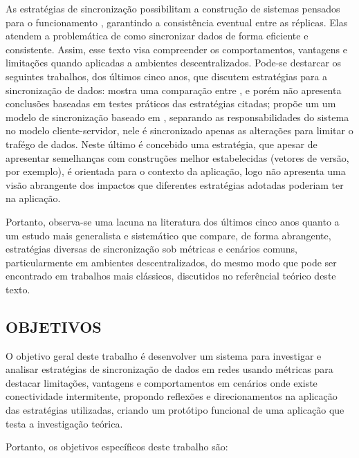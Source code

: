 As estratégias de sincronização possibilitam a construção de sistemas pensados para o funcionamento , garantindo a consistência eventual entre as réplicas. Elas atendem a problemática de como sincronizar dados de forma eficiente e consistente. Assim, esse texto visa compreender os comportamentos, vantagens e limitações quando aplicadas a ambientes descentralizados. Pode-se destarcar os seguintes trabalhos, dos últimos cinco anos, que discutem estratégias para a sincronização de dados:  \cite{pothineni2024offlinefirst} mostra uma comparação entre ,  e  porém não apresenta conclusões baseadas em testes práticos das estratégias citadas;  \cite{wang2024optimizing} propõe um um modelo de sincronização baseado em , separando as responsabilidades do sistema no modelo cliente-servidor, nele é sincronizado apenas as alterações para limitar o trafégo de dados. Neste último é concebido uma estratégia, que apesar de apresentar semelhanças com construções melhor estabelecidas (vetores de versão, por exemplo), é orientada para o contexto da aplicação, logo não apresenta uma visão abrangente dos impactos que diferentes estratégias adotadas poderiam ter na aplicação. 

Portanto, observa-se uma lacuna na literatura dos últimos cinco anos quanto a um estudo mais generalista e sistemático que compare, de forma abrangente, estratégias diversas de sincronização sob métricas e cenários comuns, particularmente em ambientes descentralizados, do mesmo modo que pode ser encontrado em trabalhos mais clássicos, discutidos no referêncial teórico deste texto.

\subsection{OBJETIVOS}

O objetivo geral deste trabalho é desenvolver um sistema para investigar e analisar estratégias de sincronização de dados em redes  usando métricas para destacar limitações, vantagens e comportamentos em cenários onde existe conectividade intermitente, propondo reflexões e direcionamentos na aplicação das estratégias utilizadas, criando um protótipo funcional de uma aplicação que testa a investigação teórica. 

Portanto, os objetivos específicos deste trabalho são:


